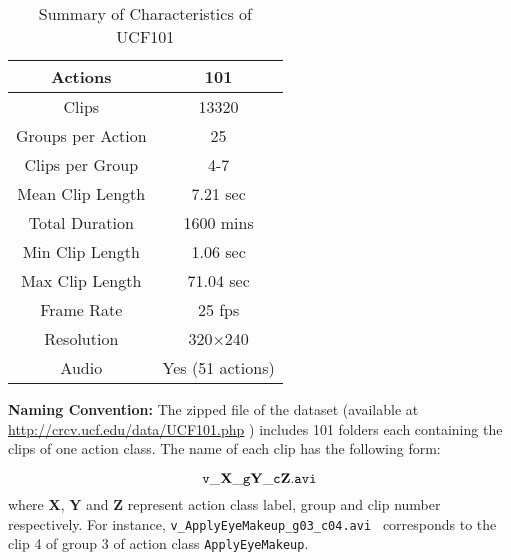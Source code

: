 \documentclass[10pt,twocolumn,letterpaper]{article}
\begin{document}
\begin{table}
\begin{center}
\begin{tabular}{|c||c|}
\hline
Actions & 101 \\
\hline
Clips  & 13320\\
\hline
Groups per Action & 25  \\
\hline
Clips per Group  & 4-7\\
\hline
Mean Clip Length & 7.21 sec  \\
\hline
Total Duration   & 1600 mins \\
\hline
Min Clip Length & 1.06 sec  \\
\hline
 Max Clip Length  & 71.04 sec\\
\hline
Frame Rate & 25 fps  \\
\hline
 Resolution  & 320$\times$240\\
\hline
 Audio  & Yes (51 actions)\\
\hline
\end{tabular}
\end{center}
\caption{Summary of Characteristics of UCF101}
\label{tab:summary}
\end{table}



\textbf{Naming Convention:} The zipped file of the dataset (available at \url{http://crcv.ucf.edu/data/UCF101.php} ) includes 101 folders each containing the clips of one action class. The name of each clip has the following form:

\begin{equation}
{\tt v\_\textbf{X}\_g\textbf{Y}\_c\textbf{Z}.avi }
\nonumber
\end{equation}
where \textbf{X}, \textbf{Y} and \textbf{Z} represent action class label, group and clip number respectively. For instance, {\tt v\_ApplyEyeMakeup\_g03\_c04.avi } corresponds to the clip 4 of group 3 of action class {\tt ApplyEyeMakeup}.
\end{document}
